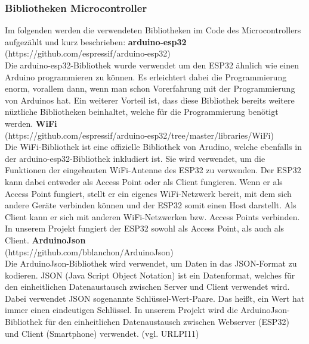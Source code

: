 \documentclass[11pt, twoside]{article}
\begin{document}
\subsubsection{Bibliotheken Microcontroller}
Im folgenden werden die verwendeten Bibliotheken im Code des Microcontrollers aufgezählt und kurz beschrieben:
\vspace{4mm}\newline
\textbf{arduino-esp32} \\
(https://github.com/espressif/arduino-esp32) \\
Die arduino-esp32-Bibliothek wurde verwendet um den ESP32 ähnlich wie einen Arduino programmieren zu können. Es erleichtert dabei die Programmierung enorm, vorallem dann, wenn man schon Vorerfahrung mit der Programmierung von Arduinos hat. Ein weiterer Vorteil ist, dass diese Bibliothek bereits weitere nüztliche Bibliotheken beinhaltet, welche für die Programmierung benötigt werden.
\vspace{4mm}\newline
\textbf{WiFi} \\
(https://github.com/espressif/arduino-esp32/tree/master/libraries/WiFi) \\
Die WiFi-Bibliothek ist eine offizielle Bibliothek von Arudino, welche ebenfalls in der arduino-esp32-Bibliothek inkludiert ist. Sie wird verwendet, um die Funktionen der eingebauten WiFi-Antenne des ESP32 zu verwenden. Der ESP32 kann dabei entweder als Access Point oder als Client fungieren. Wenn er als Access Point fungiert, stellt er ein eigenes WiFi-Netzwerk bereit, mit dem sich andere Geräte verbinden können und der ESP32 somit einen Host darstellt. Als Client kann er sich mit anderen WiFi-Netzwerken bzw. Access Points verbinden. In unserem Projekt fungiert der ESP32 sowohl als Access Point, als auch als Client.
\vspace{4mm}\newline
\textbf{ArduinoJson} \\
(https://github.com/bblanchon/ArduinoJson) \\
Die ArduinoJson-Bibliothek wird verwendet, um Daten in das JSON-Format zu kodieren. JSON (Java Script Object Notation) ist ein Datenformat, welches  für den einheitlichen Datenaustausch zwischen Server und Client verwendet wird. Dabei verwendet JSON sogenannte Schlüssel-Wert-Paare. Das heißt, ein Wert hat immer einen eindeutigen Schlüssel. In unserem Projekt wird die ArduinoJson-Bibliothek für den einheitlichen Datenaustausch zwischen Webserver (ESP32) und Client (Smartphone) verwendet. (vgl. URLPI11)
\end{document}
